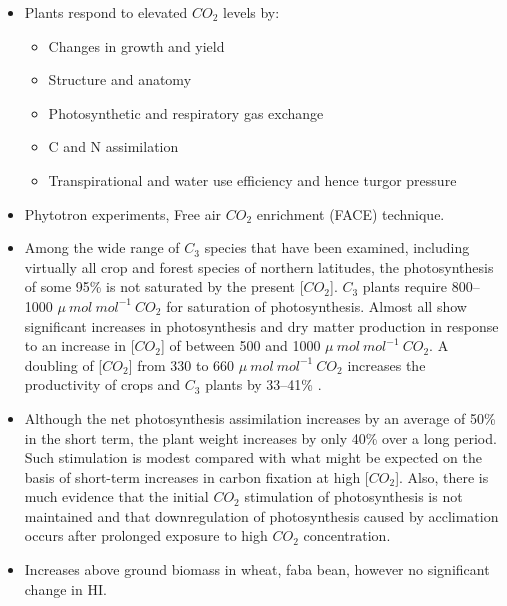 \documentclass[
  ignorenonframetext,
  aspectratio=169]{beamer}
\providecommand{\tightlist}{%
  \setlength{\itemsep}{0pt}\setlength{\parskip}{0pt}}
\begin{document}
\begin{frame}{}
\protect\hypertarget{section-2}{}
\begin{itemize}
\tightlist
\item
  Plants respond to elevated \(CO_2\) levels by:

  \begin{itemize}
  \tightlist
  \item
    Changes in growth and yield
  \item
    Structure and anatomy
  \item
    Photosynthetic and respiratory gas exchange
  \item
    C and N assimilation
  \item
    Transpirational and water use efficiency and hence turgor pressure
  \end{itemize}
\item
  Phytotron experiments, Free air \(CO_2\) enrichment (FACE) technique.
\item
  Among the wide range of \(C_3\) species that have been examined,
  including virtually all crop and forest species of northern latitudes,
  the photosynthesis of some 95\% is not saturated by the present
  {[}\(CO_2\){]}. \(C_3\) plants require 800--1000
  \(\mu~mol~mol^{-1}~CO_2\) for saturation of photosynthesis. Almost all
  show significant increases in photosynthesis and dry matter production
  in response to an increase in {[}\(CO_2\){]} of between 500 and 1000
  \(\mu~mol~mol^{-1}~CO_2\). A doubling of {[}\(CO_2\){]} from 330 to
  660 \(\mu~mol~mol^{-1}~CO_2\) increases the productivity of crops and
  \(C_3\) plants by 33--41\% .
\end{itemize}
\end{frame}

\begin{frame}{}
\protect\hypertarget{section-3}{}
\begin{itemize}
\tightlist
\item
  Although the net photosynthesis assimilation increases by an average
  of 50\% in the short term, the plant weight increases by only 40\%
  over a long period. Such stimulation is modest compared with what
  might be expected on the basis of short-term increases in carbon
  fixation at high {[}\(CO_2\){]}. Also, there is much evidence that the
  initial \(CO_2\) stimulation of photosynthesis is not maintained and
  that downregulation of photosynthesis caused by acclimation occurs
  after prolonged exposure to high \(CO_2\) concentration.
\item
  Increases above ground biomass in wheat, faba bean, however no
  significant change in HI.
\end{itemize}
\end{frame}
\end{document}
